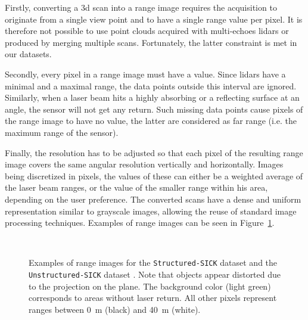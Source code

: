 Firstly, converting a \gls*{3d} scan into a range image requires the acquisition to originate from a single view point and to have a single range value per pixel. It is therefore not possible to use point clouds acquired with multi-echoes \gls*{lidar}s or produced by merging multiple scans. Fortunately, the latter constraint is met in our datasets.

Secondly, every pixel in a range image must have a value. Since \gls*{lidar}s have a minimal and a maximal range, the data points outside this interval are ignored. Similarly, when a laser beam hits a highly absorbing or a reflecting surface at an angle, the sensor will not get any return. Such missing data points cause pixels of the range image to have no value, the latter are considered as far range (i.e. the maximum range of the sensor).

Finally, the resolution has to be adjusted so that each pixel of the resulting range image covers the same angular resolution vertically and horizontally. Images being discretized in pixels, the values of these can either be a weighted average of the laser beam ranges, or the value of the smaller range within his area, depending on the user preference. The converted scans have a dense and uniform representation similar to grayscale images, allowing the reuse of standard image processing techniques. Examples of range images can be seen in Figure~\ref{fig:chap_slam_range}.

\begin{figure}[H]
    \centering
    \\
    \caption[Examples of range images from the two datasets.]{Examples of range images for the \texttt{Structured-SICK} dataset \protect{} and the \texttt{Unstructured-SICK} dataset \protect{}. Note that objects appear distorted due to the projection on the plane. The background color (light green) corresponds to areas without laser return. All other pixels represent ranges between \SI{0}{\meter} (black) and \SI{40}{\meter} (white).}
    \label{fig:chap_slam_range}
\end{figure}

